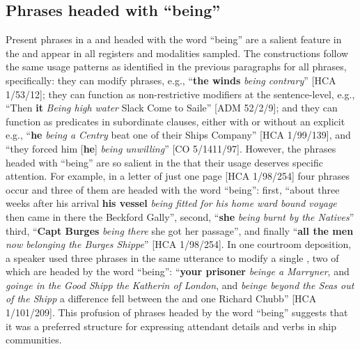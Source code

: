 \subsection{{Phrases headed with “being”}}\label{sec:5.5.3}

Present  phrases in a  and headed with the word “being” are a salient feature in the  and appear in all registers and modalities sampled. The  constructions follow the same usage patterns as identified in the previous paragraphs for all  phrases, specifically: they can modify  phrases, e.g., “\textbf{the winds} \textit{being contrary}” [HCA 1/53/12]; they can function as non-restrictive modifiers at the sentence-level, e.g., “Then \textbf{it} \textit{Being high water} Slack Come to Saile” [ADM 52/2/9]; and they can function as predicates in subordinate clauses, either with or without an explicit  e.g., “\textbf{he} \textit{being a Centry} beat one of their Ships Company” [HCA 1/99/139], and “they forced him [\textbf{he}] \textit{being unwilling}” [CO 5/1411/97]. However, the  phrases headed with “being” are so salient in the  that their usage deserves specific attention. For example, in a letter of just one page [HCA 1/98/254] four  phrases occur and three of them are headed with the word “being”: first, “about three weeks after his arrival \textbf{his vessel} \textit{being fitted for his home ward bound voyage} then came in there the Beckford Gally”, second, “\textbf{she} \textit{being burnt by the Natives}” third, “\textbf{Capt Burges} \textit{being there} she got her passage”, and finally “\textbf{all the men} \textit{now belonging the Burges Shippe}” [HCA 1/98/254]. In one courtroom deposition, a speaker used three  phrases in the same utterance to modify a single , two of which are headed by the word “being”: “\textbf{your prisoner} \textit{beinge a Marryner}, and \textit{goinge in the Good Shipp the Katherin of London}, and \textit{beinge beyond the Seas out of the Shipp} a difference fell between the  and one Richard Chubb” [HCA 1/101/209]. This profusion of  phrases headed by the word “being” suggests that it was a preferred structure for expressing attendant details and  verbs in ship communities. 

